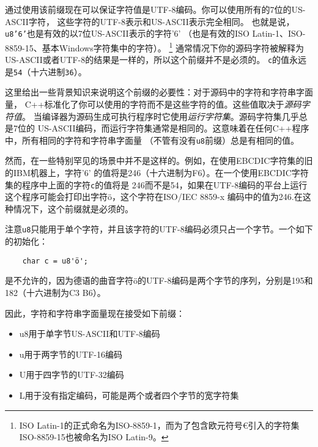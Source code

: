 通过使用该前缀现在可以保证字符值是UTF-8编码。你可以使用所有的7位的US-ASCII字符，
这些字符的UTF-8表示和US-ASCII表示完全相同。
也就是说，\texttt{u8'6'}也是有效的以7位US-ASCII表示的字符'6'
（也是有效的ISO Latin-1、ISO-8859-15、基本Windows字符集中的字符）。
\footnote{ISO Latin-1的正式命名为ISO-8859-1，而为了包含欧元符号€引入的字符集
ISO-8859-15也被命名为ISO Latin-9。}
通常情况下你的源码字符被解释为US-ASCII或者UTF-8的结果是一样的，所以这个前缀并不是必须的。
\texttt{c}的值永远是\texttt{54}（十六进制\texttt{36}）。

这里给出一些背景知识来说明这个前缀的必要性：对于源码中的字符和字符串字面量，
C++标准化了你可以使用的字符而不是这些字符的值。这些值取决于\emph{源码字符值}。
当编译器为源码生成可执行程序时它使用\emph{运行字符集}。源码字符集几乎总是7位的
US-ASCII编码，而运行字符集通常是相同的。这意味着在任何C++程序中，所有相同的字符和字符串字面量
（不管有没有\texttt{u8}前缀）总是有相同的值。

然而，在一些特别罕见的场景中并不是这样的。例如，在使用EBCDIC字符集的旧的IBM机器上，字符'6'
的值将是246（十六进制为F6）。在一个使用EBCDIC字符集的程序中上面的字符\texttt{c}的值将是
246而不是54，如果在UTF-8编码的平台上运行这个程序可能会打印出字符ö，这个字符在ISO/IEC 8859-x
编码中的值为246.在这种情况下，这个前缀就是必须的。

注意\texttt{u8}只能用于单个字符，并且该字符的UTF-8编码必须只占一个字节。一个如下的初始化：
\begin{lstlisting}
    char c = u8'ö';
\end{lstlisting}
是不允许的，因为德语的曲音字符ö的UTF-8编码是两个字节的序列，分别是195和182（十六进制为C3 B6）。

因此，字符和字符串字面量现在接受如下前缀：
\begin{itemize}[leftmargin=*]
    \item u8用于单字节US-ASCII和UTF-8编码
    \item u用于两字节的UTF-16编码
    \item U用于四字节的UTF-32编码
    \item L用于没有指定编码，可能是两个或者四个字节的宽字符集
\end{itemize}

